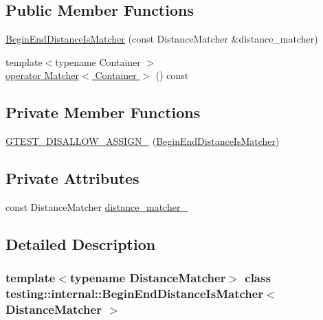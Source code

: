\subsection*{Public Member Functions}
\begin{DoxyCompactItemize}
\item 
\hyperlink{classtesting_1_1internal_1_1BeginEndDistanceIsMatcher_aaf0d34d922d89820346e80a21cbf8d24}{Begin\+End\+Distance\+Is\+Matcher} (const Distance\+Matcher \&distance\+\_\+matcher)
\item 
{\footnotesize template$<$typename Container $>$ }\\\hyperlink{classtesting_1_1internal_1_1BeginEndDistanceIsMatcher_af4d79ed63bce73e5cecd6f542aeb57ce}{operator Matcher$<$ Container $>$} () const
\end{DoxyCompactItemize}
\subsection*{Private Member Functions}
\begin{DoxyCompactItemize}
\item 
\hyperlink{classtesting_1_1internal_1_1BeginEndDistanceIsMatcher_ad2e35ceac0be922c59514a8f247ab622}{G\+T\+E\+S\+T\+\_\+\+D\+I\+S\+A\+L\+L\+O\+W\+\_\+\+A\+S\+S\+I\+G\+N\+\_\+} (\hyperlink{classtesting_1_1internal_1_1BeginEndDistanceIsMatcher}{Begin\+End\+Distance\+Is\+Matcher})
\end{DoxyCompactItemize}
\subsection*{Private Attributes}
\begin{DoxyCompactItemize}
\item 
const Distance\+Matcher \hyperlink{classtesting_1_1internal_1_1BeginEndDistanceIsMatcher_af70136950ed3d02c77f809e2b659d9a9}{distance\+\_\+matcher\+\_\+}
\end{DoxyCompactItemize}


\subsection{Detailed Description}
\subsubsection*{template$<$typename Distance\+Matcher$>$\newline
class testing\+::internal\+::\+Begin\+End\+Distance\+Is\+Matcher$<$ Distance\+Matcher $>$}




